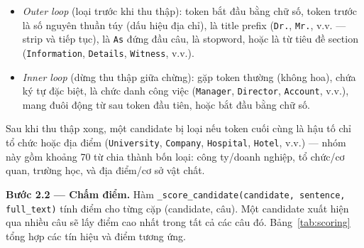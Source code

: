 \begin{itemize}[nosep]
    \item \textit{Outer loop} (loại trước khi thu thập): token bắt đầu bằng chữ
          số, token trước là số nguyên thuần túy (dấu hiệu địa chỉ), là title
          prefix (\texttt{Dr.}, \texttt{Mr.}, v.v. --- strip và tiếp tục),
          là \texttt{As} đứng đầu câu, là stopword, hoặc là từ tiêu đề section
          (\texttt{Information}, \texttt{Details}, \texttt{Witness}, v.v.).
    \item \textit{Inner loop} (dừng thu thập giữa chừng): gặp token thường
          (không hoa), chứa ký tự đặc biệt, là chức danh công việc
          (\texttt{Manager}, \texttt{Director}, \texttt{Account}, v.v.), mang
          đuôi động từ sau token đầu tiên, hoặc bắt đầu bằng chữ số.
\end{itemize}

Sau khi thu thập xong, một candidate bị loại nếu token cuối cùng là hậu tố chỉ
tổ chức hoặc địa điểm (\texttt{University}, \texttt{Company}, \texttt{Hospital},
\texttt{Hotel}, v.v.) --- nhóm này gồm khoảng 70 từ chia thành bốn loại: công
ty/doanh nghiệp, tổ chức/cơ quan, trường học, và địa điểm/cơ sở vật chất.

\textbf{Bước 2.2 --- Chấm điểm.}
Hàm \texttt{\_score\_candidate(candidate, sentence, full\_text)} tính điểm cho
từng cặp (candidate, câu). Một candidate xuất hiện qua nhiều câu sẽ lấy điểm
cao nhất trong tất cả các câu đó. Bảng~\ref{tab:scoring} tổng hợp các tín
hiệu và điểm tương ứng.

